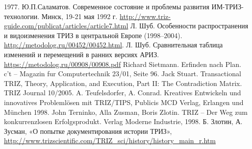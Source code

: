 \begin{thebibliography}{xxx}
  1977.
 Ю.П.Саламатов. Современное состояние и проблемы
  развития ИМ-ТРИЗ-технологии. Минск, 19-21 мая 1992 г.
  \url{http://www.triz-guide.com/publicat/articles/article7.html}
 Л. Шуб. Особенности распространения и видоизменения ТРИЗ в
  центральной Европе (1998--2004).
  \url{http://metodolog.ru/00452/00452.html}.
 Л. Шуб. Сравнительная таблица изменений и перемещений в
  ранних версиях АРИЗ. \url{https://metodolog.ru/00908/00908.pdf}
 Richard Sietmann. Erfinden nach Plan. c't -- Magazin
  fur Computertechnik 23/01, Seite 96.
 Jack Stuart. Transactional TRIZ, Theory, Application, and
  Execution, Part II: The Contradiction Matrix. TRIZ Journal 10/2005.
 A. Teufelsdorfer, A.  Conrad. Kreatives Entwickeln
  und innovatives Problemlösen mit TRIZ/TIPS, Publicis MCD Verlag, Erlangen
  und München 1998.
 John Terninko, Alla Zusman, Boris Zlotin. TRIZ -- Der
  Weg zum konkurrenzlosen Erfolgsprodukt. Verlag Moderne Industrie, 1998.
 Б. Злотин, А. Зусман, «О попытке документирования
  истории ТРИЗ»,
  \url{http://www.trizscientific.com/TRIZ_sci/history/history_main_r.htm}
\end{thebibliography}

